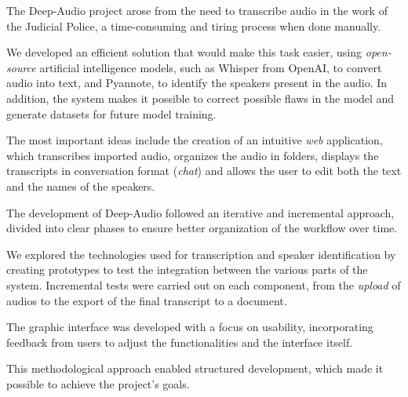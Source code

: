 
The Deep-Audio project arose from the need to transcribe audio in the work of the Judicial Police, a time-consuming and tiring process when done manually.

We developed an efficient solution that would make this task easier, using \textit{open-source} artificial intelligence models, such as Whisper from OpenAI, to convert audio into text, and Pyannote, to identify the speakers present in the audio. In addition, the system makes it possible to correct possible flaws in the model and generate datasets for future model training.

The most important ideas include the creation of an intuitive \textit{web} application, which transcribes imported audio, organizes the audio in folders, displays the transcripts in conversation format (\textit{chat}) and allows the user to edit both the text and the names of the speakers.

The development of Deep-Audio followed an iterative and incremental approach, divided into clear phases to ensure better organization of the workflow over time.

We explored the technologies used for transcription and speaker identification by creating prototypes to test the integration between the various parts of the system. Incremental tests were carried out on each component, from the \textit{upload} of audios to the export of the final transcript to a document.

The graphic interface was developed with a focus on usability, incorporating feedback from users to adjust the functionalities and the interface itself.

This methodological approach enabled structured development, which made it possible to achieve the project's goals.